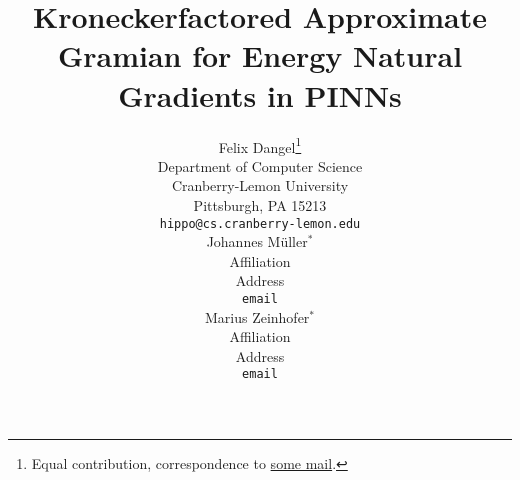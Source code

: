 \newcommand{\papertitle}{%
  Kroneckerfactored Approximate Gramian for Energy Natural Gradients in PINNs
}
\title{\papertitle}

%

\author{%
  Felix Dangel\thanks{Equal contribution, correspondence to \url{some mail}.}\\
  Department of Computer Science\\
  Cranberry-Lemon University\\
  Pittsburgh, PA 15213 \\
  \texttt{hippo@cs.cranberry-lemon.edu} \\
  \And
  Johannes M\"uller$^*$\\
  Affiliation \\
  Address \\
  \texttt{email} \\
  \And
  Marius Zeinhofer$^*$\\
  Affiliation \\
  Address \\
  \texttt{email} \\
}
